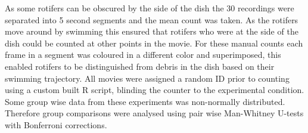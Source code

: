 As some rotifers can be obscured by the side of the dish the 30 recordings were separated into 5 second segments and the mean count was taken. As the rotifers move around by swimming this ensured that rotifers who were at the side of the dish could be counted at other points in the movie. For these manual counts each frame in a segment was coloured in a different color and superimposed, this enabled rotifers to be distinguished from debris in the dish based on their swimming trajectory. All movies were assigned a random ID prior to counting using a custom built R script, blinding the counter to the experimental condition. Some group wise data from these experiments was non-normally distributed. Therefore group comparisons were analysed using pair wise Man-Whitney U-tests with Bonferroni corrections.